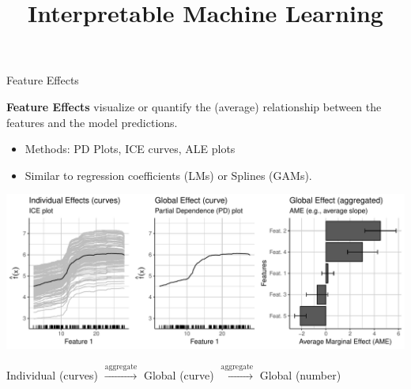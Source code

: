 \documentclass[11pt,compress,t,notes=noshow, xcolor=table]{beamer}
\title{Interpretable Machine Learning}
\institute{\href{https://compstat-lmu.github.io/lecture_iml/}{compstat-lmu.github.io/lecture\_iml}}
\date{}
\begin{document}





\begin{vbframe}{Feature Effects}

\textbf{Feature Effects} visualize or quantify the (average) relationship between the features and the model predictions. %
\begin{itemize}
\item Methods: PD Plots, ICE curves, ALE plots
\item Similar to regression coefficients (LMs) or Splines (GAMs).
\end{itemize}

\centerline{\includegraphics[width=\textwidth]{figure_man/feature-effects.pdf}}

\hspace{8px} \small Individual (curves) \hspace{2px}
$\xrightarrow[]{\text{aggregate}}$ \hspace{2px} Global (curve) \hspace{2px}
$\xrightarrow[]{\text{aggregate}}$ \hspace{2px} Global (number)



\lz

\end{vbframe}
\end{document}
